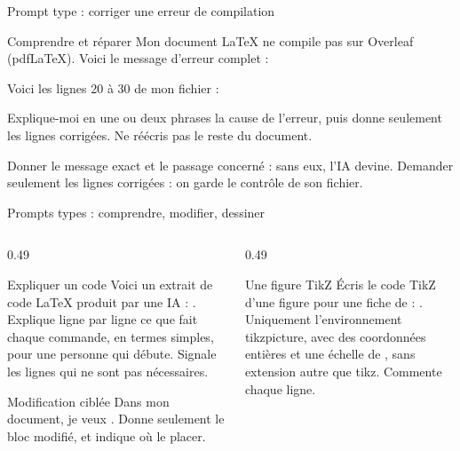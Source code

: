 \begin{frame}{Prompt type : corriger une erreur de compilation}
  \begin{Prompt}{Comprendre et réparer}
    Mon document LaTeX ne compile pas sur Overleaf (pdfLaTeX). Voici le
    message d'erreur complet :


    Voici les lignes 20 à 30 de mon fichier :


    Explique-moi en une ou deux phrases la cause de l'erreur, puis donne
    seulement les lignes corrigées. Ne réécris pas le reste du document.
  \end{Prompt}
  \small Donner le message exact et le passage concerné : sans eux,
  l'IA devine. Demander seulement les lignes corrigées : on garde le
  contrôle de son fichier.
\end{frame}

\begin{frame}{Prompts types : comprendre, modifier, dessiner}
  \begin{columns}[T]
    \begin{column}{0.49\textwidth}
      \begin{Prompt}{Expliquer un code}
        \scriptsize Voici un extrait de code LaTeX produit par une IA :
        . Explique ligne par ligne ce que fait chaque
        commande, en termes simples, pour une personne qui débute.
        Signale les lignes qui ne sont pas nécessaires.
      \end{Prompt}
      \vspace{2pt}
      \begin{Prompt}{Modification ciblée}
        \scriptsize Dans mon document, je veux . Donne seulement
        le bloc modifié, et indique où le placer.
      \end{Prompt}
    \end{column}
    \begin{column}{0.49\textwidth}
      \begin{Prompt}{Une figure TikZ}
        \scriptsize Écris le code TikZ d'une figure pour une fiche de
         : . Uniquement
        l'environnement tikzpicture, avec des coordonnées entières et
        une échelle de , sans extension autre que tikz.
        Commente chaque ligne.
      \end{Prompt}
    \end{column}
  \end{columns}
\end{frame}


